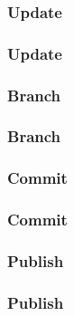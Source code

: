 	\subsubsection{Update}
		\begin{frame}
			\frametitle{Update}
		\end{frame}
	\subsubsection{Branch}
		\begin{frame}
			\frametitle{Branch}
		\end{frame}
	\subsubsection{Commit}
		\begin{frame}
			\frametitle{Commit}
		\end{frame}
	\subsubsection{Publish}
		\begin{frame}
			\frametitle{Publish}
		\end{frame}

